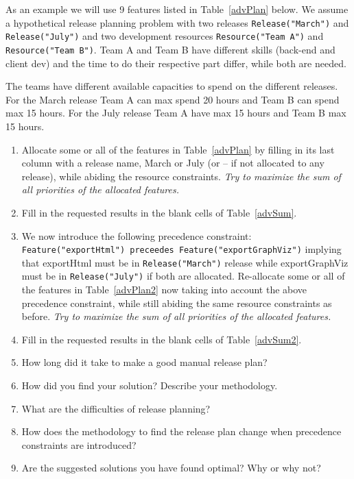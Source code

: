 \documentclass[11pt]{article}
\begin{document}
{\fontsize{9}{11}\begin{framed}
\noindent As an example we will use 9 features listed in Table~\ref{advPlan} below. We assume a hypothetical release planning problem with two releases \verb+Release("March")+ and  \verb+Release("July")+ and two development resources \verb+Resource("Team A")+ and \verb+Resource("Team B")+. Team A and Team B have different skills (back-end and client dev) and  the time to do their respective part differ, while both are needed.

The teams have different available capacities to spend on the different releases. For the March release Team A can max spend 20 hours and Team B can spend max 15 hours. For the July release Team A have max 15 hours and Team B max 15 hours.

\begin{enumerate}[noitemsep]
\item Allocate some or all of the features in Table~\ref{advPlan} by filling in its last column with a release name, March or July (or -- if not allocated to any release), while abiding the resource constraints. {\it Try to maximize the sum of all priorities of the allocated features.}
\item Fill in the requested results in the blank cells of  Table~\ref{advSum}.
\item We now introduce the following precedence constraint:\\ \verb+Feature("exportHtml") preceedes Feature("exportGraphViz")+ implying that exportHtml must be in \verb+Release("March")+ release while exportGraphViz must be in \verb+Release("July")+ if both are allocated. Re-allocate some or all of the features in Table~\ref{advPlan2} now taking into account the above precedence constraint, while still abiding the same resource constraints as before. {\it Try to maximize the sum of all priorities of the allocated features.}
\item Fill in the requested results in the blank cells of  Table~\ref{advSum2}.
\item How long did it take to make a good manual release plan? \underline{\hspace{1.3cm}}
\item How did you find your solution? Describe your methodology.
\item What are the difficulties of release planning?
\item How does the methodology to find the release plan change when precedence constraints are introduced?
\item Are the suggested solutions you have found optimal? Why or why not?
\end{enumerate}
\end{framed}
}
\end{document}
